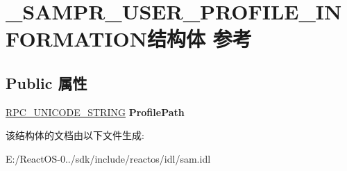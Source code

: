\hypertarget{struct___s_a_m_p_r___u_s_e_r___p_r_o_f_i_l_e___i_n_f_o_r_m_a_t_i_o_n}{}\section{\+\_\+\+S\+A\+M\+P\+R\+\_\+\+U\+S\+E\+R\+\_\+\+P\+R\+O\+F\+I\+L\+E\+\_\+\+I\+N\+F\+O\+R\+M\+A\+T\+I\+O\+N结构体 参考}
\label{struct___s_a_m_p_r___u_s_e_r___p_r_o_f_i_l_e___i_n_f_o_r_m_a_t_i_o_n}
\subsection*{Public 属性}
\begin{DoxyCompactItemize}
\item 
\mbox{\label{struct___s_a_m_p_r___u_s_e_r___p_r_o_f_i_l_e___i_n_f_o_r_m_a_t_i_o_n_adc3aaed2d4f29a8487ba4c3aee8682dd}} 
\hyperlink{struct___r_p_c___u_n_i_c_o_d_e___s_t_r_i_n_g}{R\+P\+C\+\_\+\+U\+N\+I\+C\+O\+D\+E\+\_\+\+S\+T\+R\+I\+NG} {\bfseries Profile\+Path}
\end{DoxyCompactItemize}


该结构体的文档由以下文件生成\+:\begin{DoxyCompactItemize}
\item 
E\+:/\+React\+O\+S-\/0../sdk/include/reactos/idl/sam.\+idl\end{DoxyCompactItemize}
